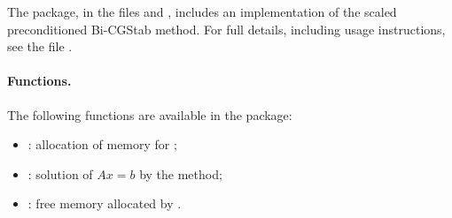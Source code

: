 %
The {\spbcg} package, in the files  and , includes an
implementation of the scaled preconditioned Bi-CGStab method.  
For full details, including usage instructions, see the file .

\paragraph*{Functions.}
The following functions are available in the {\spbcg} package:  
\begin{itemize}
\item {}: allocation of memory for ;
\item {}: solution of $Ax = b$ by the {\spbcg} method;
\item {}: free memory allocated by .
\end{itemize}
